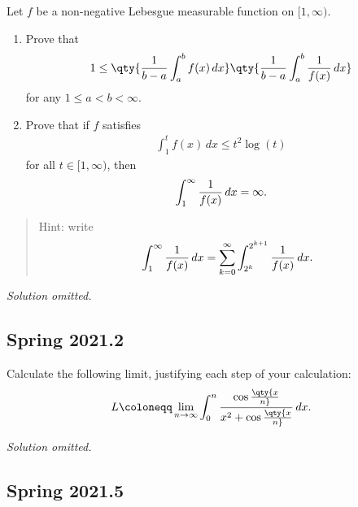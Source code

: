 \begin{problem}[?]

Let \(f\) be a non-negative Lebesgue measurable function on
\([1, \infty)\).

\begin{enumerate}
\def\labelenumi{\alph{enumi}.}
\item
  Prove that
  \begin{align*}  
  1 \leq \qty{
  {1 \over b-a} \int_a^b f(x) \,dx
  }\qty{
  {1\over b-a} \int_a^b {1 \over f(x)}\, dx
  }
  \end{align*}
  for any \(1\leq a < b <\infty\).
\item
  Prove that if \(f\) satisfies
  \begin{align*}  
  \int_1^t f(x) \, dx \leq t^2 \log(t)
  \end{align*}
  for all \(t\in [1, \infty)\), then
  \begin{align*}  
  \int_1^\infty {1\over f(x)}\,dx= \infty
  .\end{align*}
\end{enumerate}

\begin{quote}
Hint: write
\begin{align*}  
\int_1^\infty {1\over f(x) }\,dx= \sum_{k=0}^\infty \int_{2^k}^{2^{k+1}} {1 \over f(x)}\,dx
.\end{align*}
\end{quote}

\end{problem}

\emph{Solution omitted.}

\hypertarget{spring-2021.2}{%
\subsection{Spring 2021.2}\label{spring-2021.2}}

\begin{problem}[?]

Calculate the following limit, justifying each step of your calculation:
\begin{align*}
L \coloneqq\lim_{n\to \infty} \int_0^n { \cos\qty{x\over n} \over x^2 + \cos\qty{x\over n} }\,dx
.\end{align*}

\end{problem}

\emph{Solution omitted.}

\hypertarget{spring-2021.5}{%
\subsection{Spring 2021.5}\label{spring-2021.5}}

